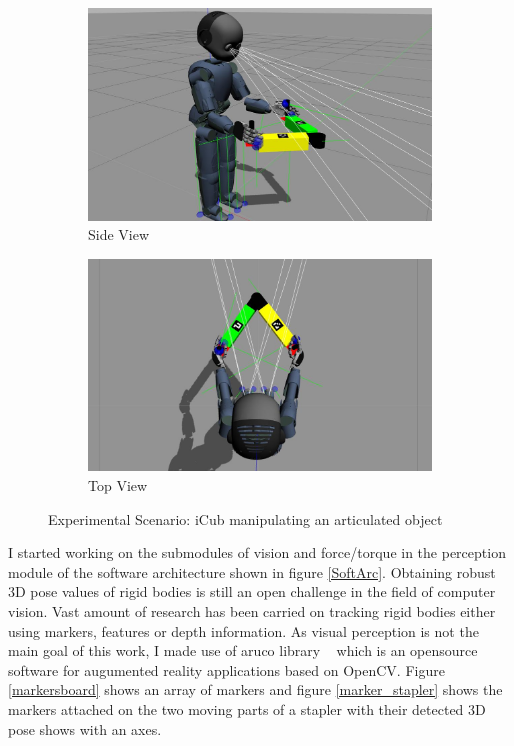\documentclass[12pt,a4paper]{report}
\begin{document}
\begin{figure}[H]
	\begin{subfigure}[b]{0.5\textwidth}
		\centering
		\includegraphics[scale=0.22]{figures/icub_object_side.jpg}
		\caption{Side View}
		\label{pmodel}
	\end{subfigure}
	\begin{subfigure}[b]{0.5\textwidth}
		\centering
		\includegraphics[scale=0.22]{figures/icub_object_top.jpg}
		\caption{Top View}
		\label{rmodel}
	\end{subfigure}
	\caption{Experimental Scenario: iCub manipulating an articulated object}
	\label{icub_object}
\end{figure}


I started working on the submodules of vision and force/torque in the perception module of the software architecture shown in figure \ref{SoftArc}. Obtaining robust 3D pose values of rigid bodies is still an open challenge in the field of computer vision. Vast amount of research has been carried on tracking rigid bodies either using markers, features or depth information. As visual perception is not the main goal of this work, I made use of aruco library ~\cite{Aruco2014} which is an opensource software for augumented reality applications based on OpenCV. Figure \ref{markersboard} shows an array of markers and figure \ref{marker_stapler} shows the markers attached on the two moving parts of a stapler with their detected 3D pose shows with an axes.
\end{document}

